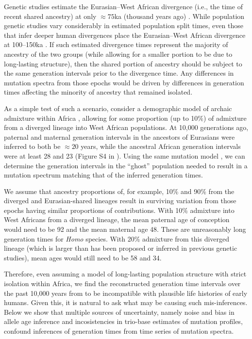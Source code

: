 \documentclass[]{article}
\begin{document}
Genetic studies estimate the Eurasian--West African divergence (i.e., the time
of recent shared ancestry) at only $\approx 75$ka (thousand years ago)
\citep[e.g.,][]{pagani2015tracing,others}. While population genetic studies
vary considerably in estimated population split times, even those that infer
deeper human divergences place the Eurasian--West African divergence at
100--150ka \citep[e.g.,][]{schlebusch2017southern}. If such estimated
divergence times represent the majority of ancestry of the two groups (while
allowing for a smaller portion to be due to long-lasting structure), then the
shared portion of ancestry should be subject to the same generation intervals
prior to the divergence time. Any differences in mutation spectra from those
epochs would be driven by differences in generation times affecting the
minority of ancestry that remained isolated. 

As a simple test of such a scenario, consider a demographic model of archaic
admixture within Africa \citep[e.g.,][]{durvasula2020recovering}, allowing for
some proportion (up to 10\%) of admixture from a diverged lineage into West
African populations. At 10,000 generations ago, paternal and maternal
generation intervals in the ancestors of Eurasians were inferred to both be
$\approx20$ years, while the ancestral African generation intervals were at
least 28 and 23 (Figure S4 in \citet{wang2023human}). Using the same mutation
model \citep{jonsson2017parental}, we can determine the generation intervals in
the ``ghost'' population needed to result in a mutation spectrum matching that
of the inferred generation times.

We assume that ancestry proportions of, for example, 10\% and 90\% from the
diverged and Eurasian-shared lineages result in surviving variation from those
epochs having similar proportions of contributions. With 10\% admixture into
West Africans from a diverged lineage, the mean paternal age of conception
would need to be 92 and the mean maternal age 48. These are unreasonably long
generation times for \emph{Homo} species. With 20\% admixture from this
diverged lineage (which is larger than has been proposed or inferred in
previous genetic studies), mean ages would still need to be 58 and 34.

Therefore, even assuming a model of long-lasting population structure with
strict isolation within Africa, we find the reconstructed generation time
intervals over the past 10,000 years from \citet{wang2023human} to be
incompatible with plausible life histories of early humans. Given this, it is
natural to ask what may be causing such mis-inferences. Below we show that
multiple sources of uncertainty, namely noise and bias in allele age inference
and incosistencies in trio-base estimates of mutation profiles, confound
inferences of generation times from time series of mutation spectra.
\end{document}
